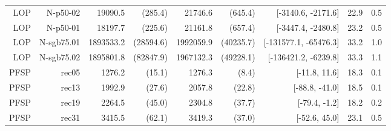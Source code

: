 \documentclass[sigconf,dvipsnames]{acmart}
\begin{document}
\begin{table}[]
\begin{tabular}{rrrrrrrrr}
LOP                           & N-p50-02                      & 19090.5          & (285.4)        & 21746.6         & (645.4)        & {[}-3140.6, -2171.6{]}                                                                                                  & 22.9              & 0.5              \\
LOP                           & N-p50-01                      & 18197.7          & (225.6)        & 21161.8         & (657.4)        & {[}-3447.4, -2480.8{]}                                                                                                  & 23.2              & 0.5              \\
LOP                           & N-sgb75.01                    & 1893533.2        & (28594.6)      & 1992059.9       & (40235.7)      & {[}-131577.1, -65476.3{]}                                                                                               & 33.2              & 1.0              \\
LOP                           & N-sgb75.02                    & 1895801.8        & (82847.9)      & 1967132.3       & (49228.1)      & {[}-136421.2, -6239.8{]}                                                                                                & 33.3              & 1.1              \\
PFSP                          & rec05                         & 1276.2           & (15.1)         & 1276.3          & (8.4)          & {[}-11.8, 11.6{]}                                                                                                       & 18.3              & 0.1              \\
PFSP                          & rec13                         & 1992.9           & (27.6)         & 2057.8          & (22.8)         & {[}-88.8, -41.0{]}                                                                                                      & 18.5              & 0.1              \\
PFSP                          & rec19                         & 2264.5           & (45.0)         & 2304.8          & (37.7)         & {[}-79.4, -1.2{]}                                                                                                       & 18.2              & 0.2              \\
PFSP                          & rec31                         & 3415.5           & (62.1)         & 3419.3          & (37.0)         & {[}-52.6, 45.0{]}                                                                                                       & 23.1              & 0.5             
\end{tabular}
\end{table}
\end{document}
